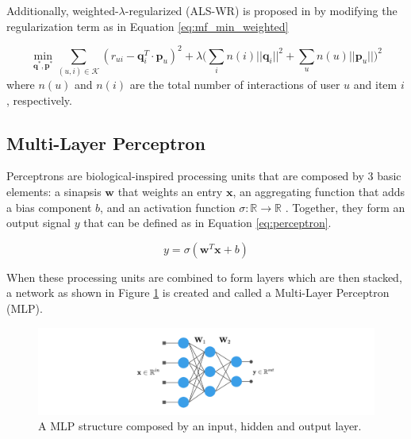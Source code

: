     Additionally, weighted-$\lambda$-regularized (ALS-WR) is proposed in \cite{2008ALSWR} by modifying the regularization term as in Equation \ref{eq:mf_min_weighted}
    
    \begin{equation}
        \label{eq:mf_min_weighted}
        \min_{\mathbf{q}^*, \mathbf{p}^*} \sum_{(u,i) \in \mathcal{K}} (r_{ui} - \mathbf{q}^T_i \cdot \mathbf{p}_u)^2 + \lambda \Big(\sum_i n(i)||\mathbf{q}_i||^2 + \sum_u n(u)||\mathbf{p}_u||\Big)^2
    \end{equation} where $n(u)$ and $n(i)$ are the total number of interactions of user $u$ and item $i$, respectively.

\subsection{Multi-Layer Perceptron}

     Perceptrons are biological-inspired processing units that are composed by 3 basic elements: a sinapsis $\mathbf{w}$ that weights an entry $\mathbf{x}$, an aggregating function that adds a bias component $b$, and an activation function $\sigma: \mathbb{R} \rightarrow \mathbb{R}$ \cite{Rosenblatt58theperceptron}. Together, they form an output signal $y$ that can be defined as in Equation \ref{eq:perceptron}.
     
     \begin{equation}
        y = \sigma (\mathbf{w}^T \mathbf{x} + b)
         \label{eq:perceptron}
     \end{equation}
     
    When these processing units are combined to form layers which are then stacked, a network as shown in Figure \ref{fig:mlp} is created and called a Multi-Layer Perceptron (MLP). 
    
    \begin{figure}[ht]
        \centering
        \includegraphics[width=\textwidth]{figs/mlp.png}
        \caption{A MLP structure composed by an input, hidden and output layer.}
        \label{fig:mlp}
    \end{figure}
    
